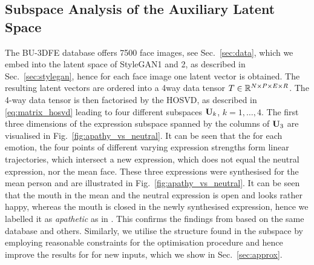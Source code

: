 \subsection{Subspace Analysis of the Auxiliary Latent Space}
\label{sec:subspace}
The BU-3DFE database offers 7500 face images, see Sec.~\ref{sec:data}, %
which we embed into the latent space of StyleGAN1 and 2, as described in Sec.~\ref{sec:stylegan}, hence for each face image one latent vector is obtained. 
The resulting latent vectors are ordered into a 4way data tensor $T\in\mathbb{R}^{N\times P\times E \times R}$. %
The 4-way data tensor is then factorised by the HOSVD, as described in \eqref{eq:matrix_hosvd} leading to four different subspaces %
$\mathbf{U}_k$, $k=1,\ldots,4$. %
The first three dimensions of the expression subspace spanned by the columns of $\mathbf{U}_3$ are visualised in Fig.~\ref{fig:apathy_vs_neutral}. 
It can be seen that the for each emotion, the four points of different varying expression strengths form linear trajectories, which intersect a new expression, which does not equal the neutral expression, nor the mean face. 
These three expressions were synthesised for the mean person and are illustrated in Fig.~\ref{fig:apathy_vs_neutral}. 
It can be seen that the mouth in the mean and the neutral expression is open and looks rather happy, whereas the mouth is closed in the newly synthesised  expression, hence we labelled it as \emph{apathetic} as in \cite{apathy,grasshof2020}. 
This confirms the findings from \cite{apathy,grasshof2020} based on the same database and others. 
Similarly, we utilise the structure found in the subspace by employing reasonable constraints for the optimisation procedure and hence improve the results for for new inputs, which we show in Sec.~\ref{sec:approx}. 

